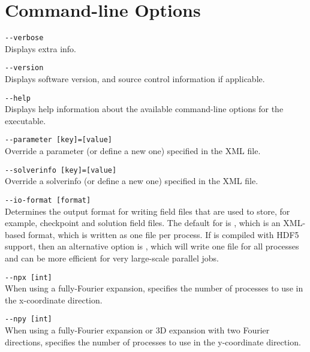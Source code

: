 \chapter{Command-line Options}

\lstinline[style=BashInputStyle]{--verbose}\\
\hangindent=1.5cm
Displays extra info.

\lstinline[style=BashInputStyle]{--version}\\
\hangindent=1.5cm
Displays software version, and source control information if applicable.

\lstinline[style=BashInputStyle]{--help}\\
\hangindent=1.5cm
Displays help information about the available command-line options for the executable.

\lstinline[style=BashInputStyle]{--parameter [key]=[value]}\\
\hangindent=1.5cm
Override a parameter (or define a new one) specified in the XML file.

\lstinline[style=BashInputStyle]{--solverinfo [key]=[value]}\\
\hangindent=1.5cm
Override a solverinfo (or define a new one) specified in the XML file.

\lstinline[style=BashInputStyle]{--io-format [format]}\\
\hangindent=1.5cm Determines the output format for writing \nekpp field files
that are used to store, for example, checkpoint and solution field files. The
default for  is , which is an XML-based format, which
is written as one file per process. If \nekpp is compiled with HDF5 support,
then an alternative option is , which will write one file for all
processes and can be more efficient for very large-scale parallel jobs.

\lstinline[style=BashInputStyle]{--npx [int]}\\
\hangindent=1.5cm
When using a fully-Fourier expansion, specifies the number of processes to use in the x-coordinate direction.

\lstinline[style=BashInputStyle]{--npy [int]}\\
\hangindent=1.5cm
\quad When using a fully-Fourier expansion or 3D expansion with two Fourier directions, specifies the number of processes to use in the y-coordinate direction.

